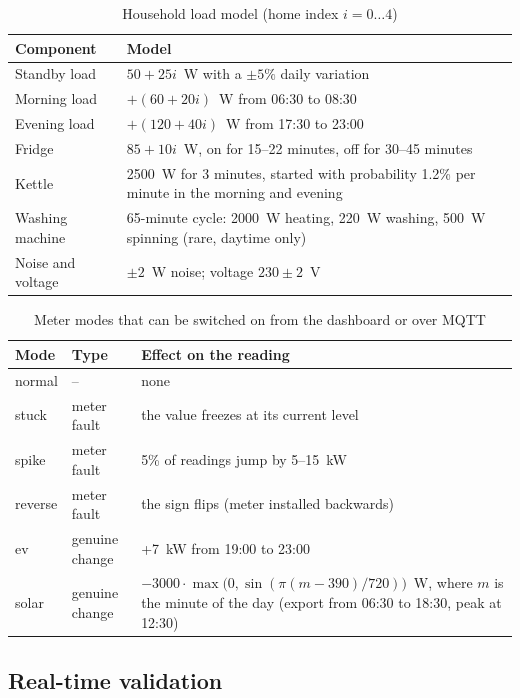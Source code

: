 \documentclass[12pt,a4paper,oneside]{report}
\begin{document}
\begin{table}[H]
\centering
\caption{Household load model (home index $i = 0 \dots 4$)}
\label{tab:sim}
\small
\begin{tabularx}{\textwidth}{>{\raggedright\arraybackslash}p{3.3cm} L}
\toprule
\textbf{Component} & \textbf{Model}\\
\midrule
Standby load & $50 + 25i$~W with a $\pm 5\%$ daily variation \\
Morning load & $+(60 + 20i)$~W from 06:30 to 08:30 \\
Evening load & $+(120 + 40i)$~W from 17:30 to 23:00 \\
Fridge & $85 + 10i$~W, on for 15--22 minutes, off for 30--45 minutes \\
Kettle & 2500~W for 3 minutes, started with probability 1.2\% per minute in the morning and evening \\
Washing machine & 65-minute cycle: 2000~W heating, 220~W washing, 500~W spinning (rare, daytime only) \\
Noise and voltage & $\pm 2$~W noise; voltage $230 \pm 2$~V \\
\bottomrule
\end{tabularx}
\end{table}

\begin{table}[H]
\centering
\caption{Meter modes that can be switched on from the dashboard or over MQTT}
\label{tab:modes}
\small
\begin{tabularx}{\textwidth}{>{\ttfamily}l l L}
\toprule
\textbf{\rmfamily Mode} & \textbf{Type} & \textbf{Effect on the reading}\\
\midrule
normal & -- & none \\
stuck & meter fault & the value freezes at its current level \\
spike & meter fault & 5\% of readings jump by 5--15~kW \\
reverse & meter fault & the sign flips (meter installed backwards) \\
ev & genuine change & +7~kW from 19:00 to 23:00 \\
solar & genuine change & $-3000\cdot\max\!\big(0,\sin(\pi(m-390)/720)\big)$~W, where $m$ is the minute of the day (export from 06:30 to 18:30, peak at 12:30) \\
\bottomrule
\end{tabularx}
\end{table}

\subsection{Real-time validation}
\end{document}
